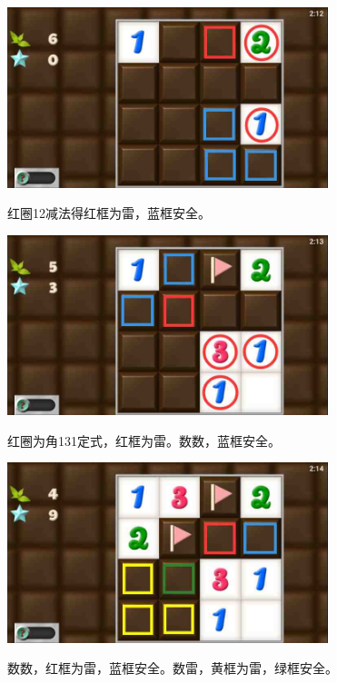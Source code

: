 \subsection{} %
\begin{center}
    \includegraphics[width=0.7\textwidth]{puzzlelow/27-1.jpg}
\end{center}
红圈12减法得红框为雷，蓝框安全。
\begin{center}
    \includegraphics[width=0.7\textwidth]{puzzlelow/27-2.jpg}
\end{center}
红圈为角131定式，红框为雷。数数，蓝框安全。
\begin{center}
    \includegraphics[width=0.7\textwidth]{puzzlelow/27-3.jpg}
\end{center}
数数，红框为雷，蓝框安全。数雷，黄框为雷，绿框安全。

